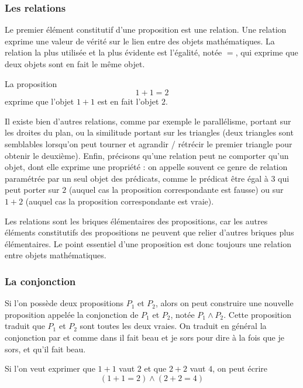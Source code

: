 \subsubsection{Les relations}

Le premier élément constitutif d'une proposition est une relation. Une relation exprime une valeur de vérité sur le lien entre des objets mathématiques. La relation la plus utilisée et la plus évidente est l'égalité, notée $=$, qui exprime que deux objets sont en fait le même objet.

\begin{expl}
    La proposition $$ 1+1=2$$ exprime que l'objet $1+1$ est en fait l'objet $2$.
\end{expl}

Il existe bien d'autres relations, comme par exemple le parallélisme, portant sur les droites du plan, ou la similitude portant sur les triangles (deux triangles sont semblables lorsqu'on peut tourner et agrandir / rétrécir le premier triangle pour obtenir le deuxième). Enfin, précisons qu'une relation peut ne comporter qu'un objet, dont elle exprime une propriété : on appelle souvent ce genre de relation paramétrée par un seul objet des prédicats, comme le prédicat \og être égal à 3\fg{} qui peut porter sur $2$ (auquel cas la proposition correspondante est fausse) ou sur $1+2$ (auquel cas la proposition correspondante est vraie).

Les relations sont les briques élémentaires des propositions, car les autres éléments constitutifs des propositions ne peuvent que relier d'autres briques plus élémentaires. Le point essentiel d'une proposition est donc toujours une relation entre objets mathématiques.

\subsubsection{La conjonction}

Si l'on possède deux propositions $P_1$ et $P_2$, alors on peut construire une nouvelle proposition appelée la conjonction de $P_1$ et $P_2$, notée $P_1\land P_2$. Cette proposition traduit que $P_1$ et $P_2$ sont toutes les deux vraies. On traduit en général la conjonction par \og et\fg{} comme dans \og il fait beau et je sors\fg{} pour dire à la fois que je sors, et qu'il fait beau.

\begin{expl}
    Si l'on veut exprimer que $1+1$ vaut $2$ et que $2+2$ vaut $4$, on peut écrire $$(1+1=2)\land (2+2=4)$$
\end{expl}

